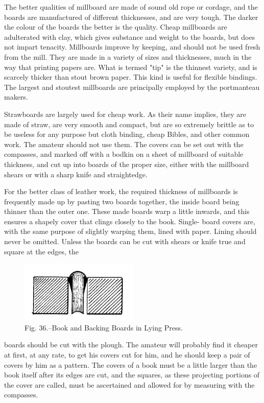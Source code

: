 \documentclass[twoside]{book}
\begin{document}
The better qualities of millboard are made of
sound old rope or cordage, and the boards are
manufactured of different thicknesses, and are very
tough. The darker the colour of the boards the
better is the quality. Cheap millboards are
adulterated with clay, which gives substance and weight
to the boards, but does not impart tenacity.
Millboards improve by keeping, and should not be used
fresh from the mill. They are made in a variety of
sizes and thicknesses, much in the way that printing
papers are. What is termed "tip" is the thinnest
variety, and is scarcely thicker than stout brown
paper. This kind is useful for flexible bindings.
The largest and stoutest millboards are principally
employed by the portmanteau makers.

Strawboards are largely used for cheap work.
As their name implies, they are made of straw, are
very smooth and compact, but are so extremely
brittle as to be useless for any purpose but cloth
binding, cheap Bibles, and other common work. The
amateur should not use them. The covers can be
\pagebreak
set out with the compasses, and marked off with a
bodkin on a sheet of millboard of suitable thickness,
and cut up into boards of the proper size, either
with the millboard shears or with a sharp knife and
straightedge.

For the better class of leather work, the required
thickness of millboards is frequently made up by
pasting two boards together, the inside board being
thinner than the outer one. These made boards
warp a little inwards, and this ensures a shapely
cover that clings closely to the book. Single- board
covers are, with the same purpose of slightly warping
them, lined with paper. Lining should never
be omitted. Unless the boards can be cut with
shears or knife true and square at the edges, the
	\begin{figure}[h]
		\centering
		\includegraphics[width=0.5\textwidth]{Figures/_036.png}
		\caption*{Fig. 36.--Book and Backing Boards in Lying Press.}
	\end{figure}
boards should be cut with the plough. The amateur
will probably find it cheaper at first, at any rate,
to get his covers cut for him, and he should
keep a pair of covers by him as a pattern. The
covers of a book must be a little larger than the
book itself after its edges are cut, and the squares,
as these projecting portions of the cover are called,
must be ascertained and allowed for by measuring
with the compasses.
\end{document}
